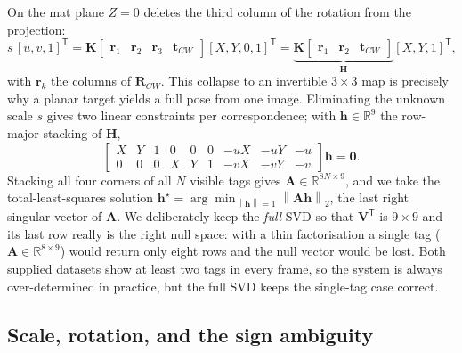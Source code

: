 \documentclass[10pt]{article}
\newcommand{\R}{\mathbf{R}}
\newcommand{\vt}[1]{\mathbf{#1}}
\newcommand{\Rcw}{\R_{CW}}
\newcommand{\norm}[1]{\left\lVert#1\right\rVert}
\begin{document}
On the mat plane $Z=0$ deletes the third column of the rotation from the projection:
\begin{equation}
s\,[u,v,1]^{\mathsf T}
= \mathbf{K}\begin{bmatrix}\vt{r}_1 & \vt{r}_2 & \vt{r}_3 & \vt{t}_{CW}\end{bmatrix}[X,Y,0,1]^{\mathsf T}
= \underbrace{\mathbf{K}\begin{bmatrix}\vt{r}_1 & \vt{r}_2 & \vt{t}_{CW}\end{bmatrix}}_{\mathbf{H}}[X,Y,1]^{\mathsf T},
\label{eq:homog}
\end{equation}
with $\vt{r}_k$ the columns of $\Rcw$. This collapse to an invertible $3\times3$ map is precisely
why a planar target yields a full pose from one image. Eliminating the unknown scale $s$ gives two
linear constraints per correspondence; with $\vt{h}\in\mathbb{R}^9$ the row-major stacking of
$\mathbf{H}$,
\begin{equation}
\begin{bmatrix}
X & Y & 1 & 0 & 0 & 0 & -uX & -uY & -u\\
0 & 0 & 0 & X & Y & 1 & -vX & -vY & -v
\end{bmatrix}\vt{h} = \vt{0}.
\end{equation}
Stacking all four corners of all $N$ visible tags gives $\mathbf{A}\in\mathbb{R}^{8N\times9}$, and
we take the total-least-squares solution $\vt{h}^\star = \arg\min_{\norm{\vt{h}}=1}
\norm{\mathbf{A}\vt{h}}_2$, the last right singular vector of $\mathbf{A}$. We deliberately keep the
\emph{full} SVD so that $\mathbf{V}^{\mathsf T}$ is $9\times9$ and its last row really is the right
null space: with a thin factorisation a single tag ($\mathbf{A}\in\mathbb{R}^{8\times9}$) would
return only eight rows and the null vector would be lost. Both supplied datasets show at least two
tags in every frame, so the system is always over-determined in practice, but the full SVD keeps the
single-tag case correct.

\subsection{Scale, rotation, and the sign ambiguity}
\end{document}
